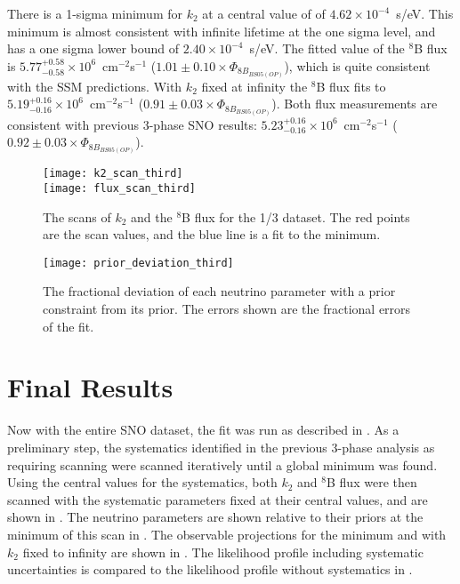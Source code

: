 There is a 1-sigma minimum for $k_2$ at a central value of of $4.62\times10^{-4}$~s/eV.
This minimum is almost consistent with infinite lifetime at the one sigma level, and has a one sigma lower bound of $2.40\times10^{-4}$~s/eV.
The fitted value of the $^8$B flux is $5.77^{+0.58}_{-0.58}\times10^6$~cm$^{-2}$s$^{-1}$ ($1.01\pm0.10 \times \Phi_{8B_{BS05(OP)}}$), which is quite consistent with the SSM predictions.
With $k_2$ fixed at infinity the $^8$B flux fits to $5.19^{+0.16}_{-0.16}\times10^6$~cm$^{-2}$s$^{-1}$ ($0.91\pm0.03 \times \Phi_{8B_{BS05(OP)}}$).
Both flux measurements are consistent with previous 3-phase SNO results: $5.23^{+0.16}_{-0.16}\times10^6$~cm$^{-2}$s$^{-1}$ ($0.92\pm0.03 \times \Phi_{8B_{BS05(OP)}}$).

\begin{figure}
\centering
\texttt{[image: k2\_scan\_third]} \\
\vspace{12pt}
\texttt{[image: flux\_scan\_third]}
\caption{The scans of $k_2$ and the $^8$B flux for the 1/3 dataset. The red points are the scan values, and the blue line is a fit to the minimum.}
\label{fig:third_scans}
\end{figure}

\begin{figure}
\centering
\texttt{[image: prior\_deviation\_third]}
\caption{The fractional deviation of each neutrino parameter with a prior constraint from its prior. The errors shown are the fractional errors of the fit.}
\label{fig:priors_third}
\end{figure}

\clearpage

\section{Final Results}
\label{final}

Now with the entire SNO dataset, the fit was run as described in . 
As a preliminary step, the systematics identified in the previous 3-phase analysis as requiring scanning were scanned iteratively until a global minimum was found.
Using the central values for the systematics, both $k_2$ and $^8$B flux were then scanned with the systematic parameters fixed at their central values, and are shown in .
The neutrino parameters are shown relative to their priors at the minimum of this scan in .
The observable projections for the minimum and with $k_2$ fixed to infinity are shown in .
The likelihood profile including systematic uncertainties is compared to the likelihood profile without systematics in .

